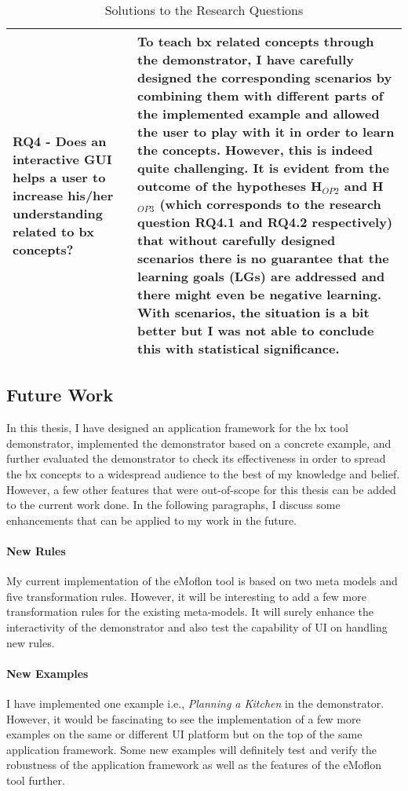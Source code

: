 \begin{table}
	\begin{tabular}{|p{5cm}|p{9.5cm}|}
		\hline	
		\textbf{RQ4 -} Does an interactive GUI helps a user to increase his/her understanding related to bx concepts? &
		To teach bx related concepts through the demonstrator, I have carefully designed the corresponding scenarios by combining them with different parts of the implemented example  and allowed the user to play with it in order to learn the concepts. However, this is indeed quite challenging. It is evident from the outcome of the hypotheses H$_{OP2}$ and H$_{OP3}$ (which corresponds to the research question \textbf{RQ4.1} and \textbf{RQ4.2} respectively) that without carefully designed scenarios there is no guarantee that the learning goals (\textbf{LG}s) are addressed and there might even be negative learning.  With scenarios, the situation is a bit better but I was not able to conclude this with statistical significance.\\
		\hline			
	\end{tabular}
	\caption{Solutions to the Research Questions}
	\label{tab:Solutions_ResearchQuestions}
\end{table}

\subsection{Future Work}\label{subsec:futurework}
In this thesis, I have designed an application framework for the bx tool demonstrator, implemented the demonstrator based on a concrete example, and further evaluated the demonstrator to check its effectiveness in order to spread the bx concepts to a widespread audience to the best of my knowledge and belief. However, a few other features that were out-of-scope for this thesis can be added to the current work done. In the following paragraphs, I discuss some enhancements that can be applied to my work in the future. 
\paragraph{New Rules}
My current implementation of the eMoflon tool is based on two meta models and five transformation rules. However, it will be interesting to add a few more transformation rules for the existing meta-models. It will surely enhance the interactivity of the demonstrator and also test the capability of UI on handling new rules.

\paragraph{New Examples} I have implemented one example i.e., \textit{Planning a Kitchen} in the demonstrator. However, it would be fascinating to see the implementation of a few more examples on the same or different UI platform but on the top of the same application framework. Some new examples will definitely test and verify the robustness of the application framework as well as the features of the eMoflon tool further.

